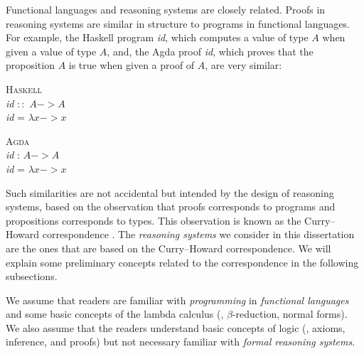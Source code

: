 Functional languages and reasoning systems are closely related.
Proofs in reasoning systems are similar in structure to programs
in functional languages. For example, the Haskell program \textit{id},
which computes a value of type $A$ when given a value of type $A$,
and, the Agda proof \textit{id}, which proves that the proposition $A$
is true when given a proof of $A$, are very similar:
\begin{center}
\begin{singlespace}
\begin{minipage}{.4\linewidth}
        \textsc{Haskell} \vspace*{.5em} \\
\textit{id} $::$ $A -> A$ \\
\textit{id} = $\lambda x -> x$
\end{minipage}
\begin{minipage}{.4\linewidth}
        \textsc{Agda}  \vspace*{.5em} \\
\textit{id} : $A -> A$ \\
\textit{id} = $\lambda x -> x$
\end{minipage}
\end{singlespace}
\end{center}\vspace*{.5em}
Such similarities are not accidental but intended by the design of
reasoning systems, based on the observation that proofs corresponds
to programs and propositions corresponds to types. This observation
is known as the Curry--Howard correspondence \cite{Howard69}.
The \emph{reasoning systems} we consider in this dissertation
are the ones that are based on the Curry--Howard correspondence.
We will explain some preliminary concepts related to the correspondence
in the following subsections.

We assume that readers are familiar with \emph{programming}
in \emph{functional languages} and some basic concepts of the lambda calculus
(\eg, $\beta$-reduction, normal forms). We also assume that the readers
understand basic concepts of logic (\eg, axioms, inference, and proofs)
but not necessary familiar with \emph{formal reasoning systems}.

